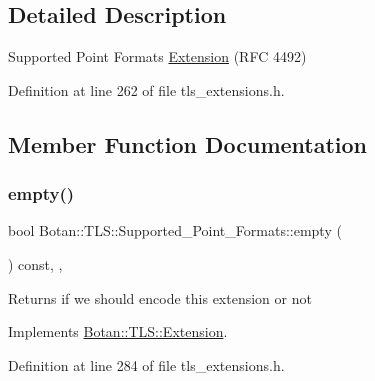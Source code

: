 \subsection{Detailed Description}
Supported Point Formats \mbox{\hyperlink{class_botan_1_1_t_l_s_1_1_extension}{Extension}} (R\+FC 4492) 

Definition at line 262 of file tls\+\_\+extensions.\+h.



\subsection{Member Function Documentation}
\mbox{\label{class_botan_1_1_t_l_s_1_1_supported___point___formats_a66014f1fe0e75931f0c7a682aa9d9083}} 
\subsubsection{\texorpdfstring{empty()}{empty()}}
{\footnotesize\ttfamily bool Botan\+::\+T\+L\+S\+::\+Supported\+\_\+\+Point\+\_\+\+Formats\+::empty (\begin{DoxyParamCaption}{ }\end{DoxyParamCaption}) const\hspace{0.3cm}{\ttfamily [inline]}, {\ttfamily [override]}, {\ttfamily [virtual]}}

\begin{DoxyReturn}{Returns}
if we should encode this extension or not 
\end{DoxyReturn}


Implements \mbox{\hyperlink{class_botan_1_1_t_l_s_1_1_extension_aa850b9be2322f94e7c65e583cd51acc5}{Botan\+::\+T\+L\+S\+::\+Extension}}.



Definition at line 284 of file tls\+\_\+extensions.\+h.

\mbox{\label{class_botan_1_1_t_l_s_1_1_supported___point___formats_aacbe9742935210838f2e17e0dcecc494}} 
